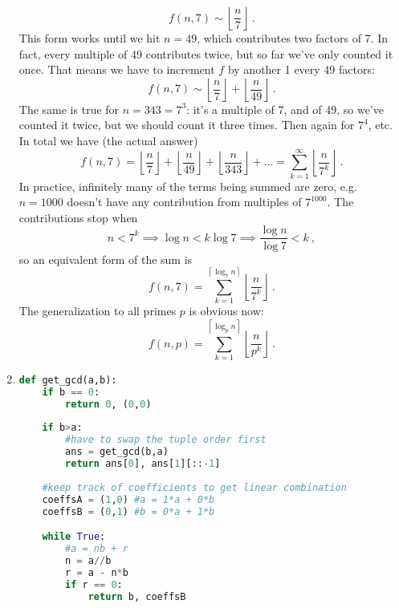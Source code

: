 \documentclass[]{article}
\begin{document}
\begin{enumerate}
\begin{equation}
f(n,7) \sim \left\lfloor \frac{n}{7} \right\rfloor\ .
\end{equation}
This form works until we hit $n=49$, which contributes two factors of 7. In fact, every multiple of 49 contributes twice, but so far we've only counted it once. That means we have to increment $f$ by another 1 every 49 factors:
\begin{equation}
f(n,7) \sim \left\lfloor \frac{n}{7} \right\rfloor + \left\lfloor \frac{n}{49} \right\rfloor\ .
\end{equation}
The same is true for $n=343=7^3$: it's a multiple of 7, and of 49, so we've counted it twice, but we should count it three times. Then again for $7^4$, etc. In total we have (the actual answer)
\begin{equation}
f(n,7) = \left\lfloor \frac{n}{7} \right\rfloor + \left\lfloor \frac{n}{49} \right\rfloor + \left\lfloor \frac{n}{343} \right\rfloor + \ldots = \sum_{k=1}^{\infty} \left\lfloor \frac{n}{7^k} \right\rfloor\ .
\end{equation}
In practice, infinitely many of the terms being summed are zero, e.g. $n=1000$ doesn't have any contribution from multiples of $7^{1000}$. The contributions stop when
\begin{equation}
n < 7^k \implies \log n < k \log 7 \implies \frac{\log n}{\log 7} < k\ ,
\end{equation}
so an equivalent form of the sum is
\begin{equation}
f(n,7) = \sum_{k=1}^{\left\lceil \log_7 n \right\rceil} \left\lfloor \frac{n}{7^k} \right\rfloor\ .
\end{equation}
The generalization to all primes $p$ is obvious now:
\begin{equation}
f(n,p) = \sum_{k=1}^{\left\lceil \log_p n \right\rceil} \left\lfloor \frac{n}{p^k} \right\rfloor\ .
\end{equation}
\item 			
\begin{lstlisting}[language=Python]
def get_gcd(a,b):
    if b == 0:
        return 0, (0,0)
        
    if b>a:
        #have to swap the tuple order first
        ans = get_gcd(b,a)
        return ans[0], ans[1][::-1]
	
    #keep track of coefficients to get linear combination
    coeffsA = (1,0) #a = 1*a + 0*b
    coeffsB = (0,1) #b = 0*a + 1*b

    while True:
        #a = nb + r
        n = a//b
        r = a - n*b
        if r == 0:
            return b, coeffsB


\end{lstlisting}
\end{enumerate}
\end{document}
